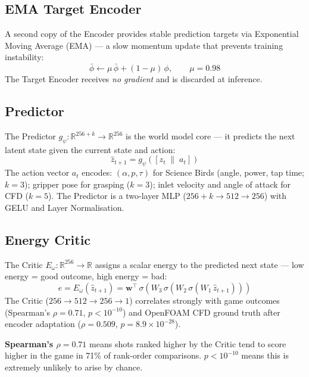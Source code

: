 \documentclass[10pt,twocolumn]{article}
\begin{document}
\subsection{EMA Target Encoder}

A second copy of the Encoder provides stable prediction targets via Exponential Moving
Average (EMA) — a slow momentum update that prevents training instability:
\begin{equation}
\bar{\phi} \leftarrow \mu\,\bar{\phi} + (1-\mu)\,\phi, \qquad \mu = 0.98
\label{eq:ema}
\end{equation}
The Target Encoder receives \emph{no gradient} and is discarded at inference.

\subsection{Predictor}

The Predictor $g_\psi : \mathbb{R}^{256+k} \to \mathbb{R}^{256}$ is the world model
core — it predicts the next latent state given the current state and action:
\begin{equation}
\hat{z}_{t+1} = g_\psi\!\left([z_t \;\|\; a_t]\right)
\label{eq:predictor}
\end{equation}
The action vector $a_t$ encodes: $(\alpha, p, \tau)$ for Science Birds (angle, power,
tap time; $k{=}3$); gripper pose for grasping ($k{=}3$); inlet velocity and angle
of attack for CFD ($k{=}5$). The Predictor is a two-layer MLP
($256{+}k \to 512 \to 256$) with GELU and Layer Normalisation.

\subsection{Energy Critic}

The Critic $E_\omega : \mathbb{R}^{256} \to \mathbb{R}$ assigns a scalar energy to the
predicted next state — low energy = good outcome, high energy = bad:
\begin{equation}
e = E_\omega(\hat{z}_{t+1}) = \mathbf{w}^\top\,\sigma\!\left(W_3\,\sigma\!\left(W_2\,
\sigma\!\left(W_1\,\hat{z}_{t+1}\right)\right)\right)
\label{eq:critic}
\end{equation}
The Critic ($256 \to 512 \to 256 \to 1$) correlates strongly with game outcomes
(Spearman's $\rho = 0.71$, $p < 10^{-10}$) and OpenFOAM CFD ground truth after encoder
adaptation ($\rho = 0.509$, $p = 8.9\times 10^{-28}$).

\begin{conceptbox}
\textbf{Spearman's $\rho = 0.71$} means shots ranked higher by the Critic tend to score
higher in the game in 71\% of rank-order comparisons. $p < 10^{-10}$ means this is
extremely unlikely to arise by chance.
\end{conceptbox}
\end{document}
